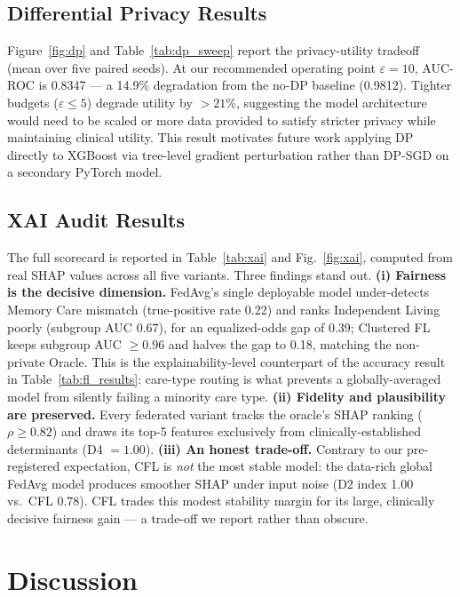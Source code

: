 \documentclass[journal]{IEEEtran}
\begin{document}
\subsection{Differential Privacy Results}
Figure~\ref{fig:dp} and Table~\ref{tab:dp_sweep} report the privacy-utility
tradeoff (mean over five paired seeds). At our recommended operating point
$\varepsilon = 10$, AUC-ROC is 0.8347 — a 14.9\% degradation from the no-DP
baseline (0.9812).
Tighter budgets ($\varepsilon \leq 5$) degrade utility by $> 21\%$, suggesting
the model architecture would need to be scaled or more data provided to satisfy
stricter privacy while maintaining clinical utility. This result motivates
future work applying DP directly to XGBoost via tree-level gradient perturbation
rather than DP-SGD on a secondary PyTorch model.

\subsection{XAI Audit Results}
The full scorecard is reported in Table~\ref{tab:xai} and Fig.~\ref{fig:xai},
computed from real SHAP values across all five variants. Three findings stand out.
\textbf{(i) Fairness is the decisive dimension.} FedAvg's single deployable model
under-detects Memory Care mismatch (true-positive rate 0.22) and ranks Independent
Living poorly (subgroup AUC 0.67), for an equalized-odds gap of 0.39; Clustered FL
keeps subgroup AUC $\geq 0.96$ and halves the gap to 0.18, matching the non-private
Oracle. This is the explainability-level counterpart of the accuracy result in
Table~\ref{tab:fl_results}: care-type routing is what prevents a globally-averaged
model from silently failing a minority care type. \textbf{(ii) Fidelity and
plausibility are preserved.} Every federated variant tracks the oracle's SHAP
ranking ($\rho \geq 0.82$) and draws its top-5 features exclusively from
clinically-established determinants (D4 $=1.00$). \textbf{(iii) An honest
trade-off.} Contrary to our pre-registered expectation, CFL is \emph{not} the most
stable model: the data-rich global FedAvg model produces smoother SHAP under input
noise (D2 index 1.00 vs.\ CFL 0.78). CFL trades this modest stability margin for
its large, clinically decisive fairness gain --- a trade-off we report rather than
obscure.

\section{Discussion}
\label{sec:discussion}
\end{document}
